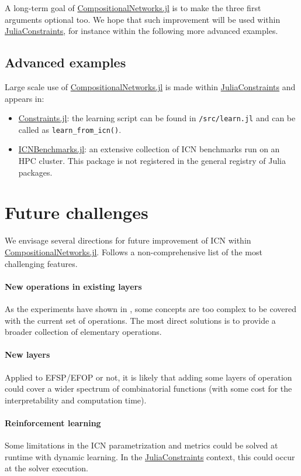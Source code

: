 \documentclass{juliacon}
\newcommand{\efsp}{\textsc{EFSP}\xspace}
\newcommand{\efop}{\textsc{EFOP}\xspace}
\newcommand{\jc}{\href{https://github.com/JuliaConstraints}{JuliaConstraints}\xspace}
\newcommand{\cnjl}{\href{https://github.com/JuliaConstraints/CompositionalNetworks.jl}{CompositionalNetworks.jl}\xspace}
\newcommand{\cjl}{\href{https://github.com/JuliaConstraints/Constraints.jl}{Constraints.jl}\xspace}
\newcommand{\icnbjl}{\href{https://github.com/JuliaConstraints/ICNBenchmarks.jl}{ICNBenchmarks.jl}\xspace}
\begin{document}
A long-term goal of \cnjl is to make the three first arguments optional too. We hope that such improvement will be used within \jc, for instance within the following more advanced examples.

\subsection{Advanced examples}
\label{subsec:advanced}

Large scale use of \cnjl is made within \jc and appears in:
\begin{itemize}
  \item \cjl: the learning script can be found in \texttt{/src/learn.jl} and can be called as \texttt{learn\_from\_icn()}.
  \item \icnbjl: an extensive collection of ICN benchmarks run on an HPC cluster. This package is not registered in the general registry of Julia packages.
\end{itemize}

\section{Future challenges}
\label{sec:future}

We envisage several directions for future improvement of ICN within \cnjl. Follows a non-comprehensive list of the most challenging features.

\paragraph*{New operations in existing layers} As the experiments have shown in \cite{richoux2020automatic,baffier2022interpretable}, some concepts are too complex to be covered with the current set of operations. The most direct solutions is to provide a broader collection of elementary operations.

\paragraph*{New layers} Applied to \efsp/\efop or not, it is likely that adding some layers of operation could cover a wider spectrum of combinatorial functions (with some cost for the interpretability and computation time).

\paragraph*{Reinforcement learning} Some limitations in the ICN parametrization and metrics could be solved at runtime with dynamic learning. In the \jc context, this could occur at the solver execution.
\end{document}
